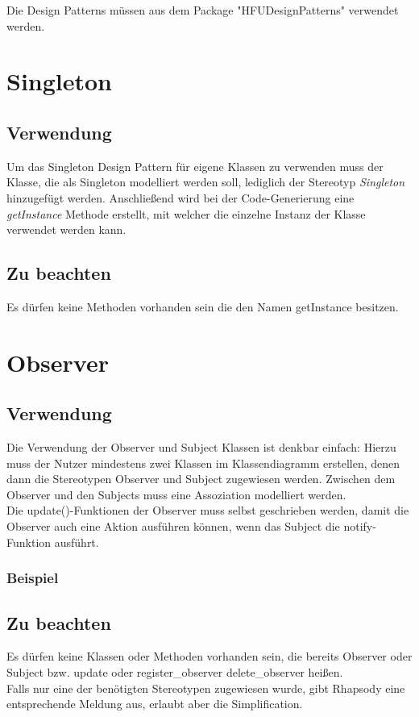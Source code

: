 Die Design Patterns müssen aus dem Package "HFUDesignPatterns" verwendet werden.

\section{Singleton}

\subsection{Verwendung}

Um das Singleton Design Pattern für eigene Klassen zu verwenden muss der Klasse, die als Singleton modelliert werden soll, lediglich der Stereotyp \textit{Singleton} hinzugefügt werden. Anschließend wird bei der Code-Generierung eine \textit{getInstance} Methode erstellt, mit welcher die einzelne Instanz der Klasse verwendet werden kann.

\subsection{Zu beachten}

Es dürfen keine Methoden vorhanden sein die den Namen getInstance besitzen.\\

\section{Observer}

\subsection{Verwendung}

Die Verwendung der Observer und Subject Klassen ist denkbar einfach: Hierzu muss
der Nutzer mindestens zwei Klassen im Klassendiagramm erstellen, denen dann die
Stereotypen Observer und Subject zugewiesen werden. Zwischen dem Observer und
den Subjects muss eine Assoziation modelliert werden. \\
Die update()-Funktionen der Observer muss selbst geschrieben werden, damit die
Observer auch eine Aktion ausführen können, wenn das Subject die notify-Funktion ausführt.

\subsubsection{Beispiel}

\subsection{Zu beachten}

Es dürfen keine Klassen oder Methoden vorhanden sein, die bereits Observer oder
Subject bzw. update oder register_observer delete_observer heißen.\\

Falls nur eine der benötigten Stereotypen zugewiesen wurde, gibt Rhapsody eine
entsprechende Meldung aus, erlaubt aber die Simplification.\\

